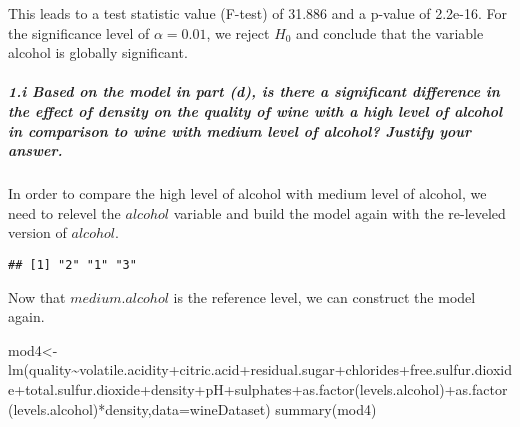 \documentclass[
]{article}
\newenvironment{Shaded}{\begin{snugshade}}{\end{snugshade}}
\newcommand{\AttributeTok}[1]{\textcolor[rgb]{0.77,0.63,0.00}{#1}}
\newcommand{\DecValTok}[1]{\textcolor[rgb]{0.00,0.00,0.81}{#1}}
\newcommand{\FunctionTok}[1]{\textcolor[rgb]{0.00,0.00,0.00}{#1}}
\newcommand{\NormalTok}[1]{#1}
\newcommand{\OtherTok}[1]{\textcolor[rgb]{0.56,0.35,0.01}{#1}}
\newcommand{\SpecialCharTok}[1]{\textcolor[rgb]{0.00,0.00,0.00}{#1}}
\begin{document}
This leads to a test statistic value (F-test) of 31.886 and a p-value of
2.2e-16. For the significance level of \(\alpha=0.01\), we reject
\(H_0\) and conclude that the variable alcohol is globally significant.

\hypertarget{i-based-on-the-model-in-part-d-is-there-a-significant-difference-in-the-effect-of-density-on-the-quality-of-wine-with-a-high-level-of-alcohol-in-comparison-to-wine-with-medium-level-of-alcohol-justify-your-answer.}{%
\subparagraph{1.i Based on the model in part (d), is there a significant
difference in the effect of density on the quality of wine with a high
level of alcohol in comparison to wine with medium level of alcohol?
Justify your
answer.}\label{i-based-on-the-model-in-part-d-is-there-a-significant-difference-in-the-effect-of-density-on-the-quality-of-wine-with-a-high-level-of-alcohol-in-comparison-to-wine-with-medium-level-of-alcohol-justify-your-answer.}}

In order to compare the high level of alcohol with medium level of
alcohol, we need to relevel the \(alcohol\) variable and build the model
again with the re-leveled version of \(alcohol\).

\begin{Shaded}
\end{Shaded}

\begin{verbatim}
## [1] "2" "1" "3"
\end{verbatim}

Now that \(medium.alcohol\) is the reference level, we can construct the
model again.

\begin{Shaded}
\begin{Highlighting}[]
\NormalTok{mod4}\OtherTok{\textless{}{-}}\FunctionTok{lm}\NormalTok{(quality}\SpecialCharTok{\textasciitilde{}}\NormalTok{volatile.acidity}\SpecialCharTok{+}\NormalTok{citric.acid}\SpecialCharTok{+}\NormalTok{residual.sugar}\SpecialCharTok{+}\NormalTok{chlorides}\SpecialCharTok{+}\NormalTok{free.sulfur.dioxide}\SpecialCharTok{+}\NormalTok{total.sulfur.dioxide}\SpecialCharTok{+}\NormalTok{density}\SpecialCharTok{+}\NormalTok{pH}\SpecialCharTok{+}\NormalTok{sulphates}\SpecialCharTok{+}\FunctionTok{as.factor}\NormalTok{(levels.alcohol)}\SpecialCharTok{+}\FunctionTok{as.factor}\NormalTok{(levels.alcohol)}\SpecialCharTok{*}\NormalTok{density,}\AttributeTok{data=}\NormalTok{wineDataset)}
\FunctionTok{summary}\NormalTok{(mod4)}
\end{Highlighting}
\end{Shaded}
\end{document}
